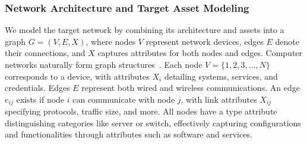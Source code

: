 


\subsubsection{Network Architecture and Target Asset Modeling}
We model the target network by combining its architecture and assets into a graph $G = (V, E, X)$, where nodes $V$ represent network devices, edges $E$ denote their connections, and $X$ captures attributes for both nodes and edges. Computer networks naturally form graph structures~\cite{2024Graph}. Each node $V = \{1, 2, 3, \dots, N\}$ corresponds to a device, with attributes $X_i$ detailing systems, services, and credentials. Edges $E$ represent both wired and wireless communications. An edge $e_{ij}$ exists if node $i$ can communicate with node $j$, with link attributes $X_{ij}$ specifying protocols, traffic size, and more. All nodes have a type attribute distinguishing categories like server or switch, effectively capturing configurations and functionalities through attributes such as software and services.



